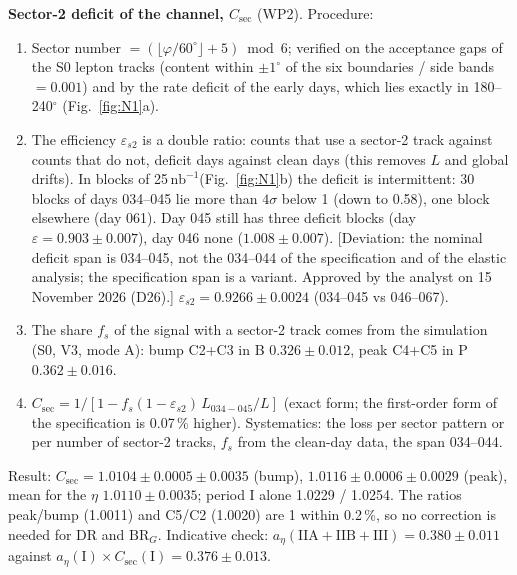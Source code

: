 \documentclass[11pt,a4paper]{article}
\newcommand{\nbinv}{\ensuremath{\mathrm{nb}^{-1}}\xspace}
\newcommand{\aEta}{\ensuremath{a_\eta}\xspace}
\newcommand{\Csec}{\ensuremath{C_{\mathrm{sec}}}\xspace}
\newcommand{\BRG}{\ensuremath{\mathrm{BR}_G}\xspace}
\newcommand{\flag}[1]{\textcolor{red!60!black}{[#1]}}
\begin{document}
\textbf{Sector-2 deficit of the channel, \Csec} (WP2). Procedure:
\begin{enumerate}\setlength{\itemsep}{0pt}
\item Sector number $=(\lfloor\varphi/60^\circ\rfloor+5)\bmod 6$; verified on the acceptance gaps of the S0 lepton tracks (content within
      $\pm1^\circ$ of the six boundaries / side bands $=0.001$) and by the rate deficit of the early days, which lies exactly in
      180--240$^\circ$ (Fig.~\ref{fig:N1}a).
\item The efficiency $\varepsilon_{s2}$ is a double ratio: counts that use a sector-2 track against counts that do not, deficit days against clean
      days (this removes $L$ and global drifts). In blocks of 25\,\nbinv (Fig.~\ref{fig:N1}b) the deficit is intermittent: 30 blocks of days
      034--045 lie more than $4\sigma$ below 1 (down to 0.58), one block elsewhere (day 061). Day 045 still has three deficit blocks (day
      $\varepsilon=0.903\pm0.007$), day 046 none ($1.008\pm0.007$). \flag{Deviation: the nominal deficit span is 034--045, not the 034--044
      of the specification and of the elastic analysis; the specification span is a variant. Approved by the analyst on 15 November 2026
      (D26).} $\varepsilon_{s2}=0.9266\pm0.0024$ (034--045
      vs 046--067).
\item The share $f_s$ of the signal with a sector-2 track comes from the simulation (S0, V3, mode A): bump C2+C3 in B $0.326\pm0.012$,
      peak C4+C5 in P $0.362\pm0.016$.
\item $\Csec=1/[1-f_s(1-\varepsilon_{s2})\,L_{034-045}/L]$ (exact form; the first-order form of the specification is 0.07\,\% higher).
      Systematics: the loss per sector pattern or per number of sector-2 tracks, $f_s$ from the clean-day data, the span 034--044.
\end{enumerate}
Result: $\Csec=1.0104\pm0.0005\pm0.0035$ (bump), $1.0116\pm0.0006\pm0.0029$ (peak), mean for the $\eta$ $1.0110\pm0.0035$; period I alone
1.0229 / 1.0254. The ratios peak/bump (1.0011) and C5/C2 (1.0020) are 1 within 0.2\,\%, so no correction is needed for DR and \BRG.
Indicative check: $\aEta(\mathrm{IIA+IIB+III})=0.380\pm0.011$ against $\aEta(\mathrm{I})\times\Csec(\mathrm{I})=0.376\pm0.013$.
\end{document}
